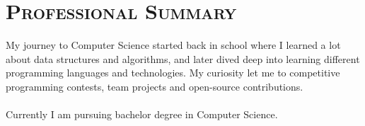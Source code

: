 \vspace*{-3em}
\section{\textsc{Professional Summary}}


My journey to Computer Science started back in school where I learned a lot about data structures and algorithms, and later dived deep into learning different programming languages and technologies. My curiosity let me to competitive programming contests, team projects and open-source contributions. \\
\vspace{-0.2cm}\\
Currently I am pursuing bachelor degree in Computer Science.
